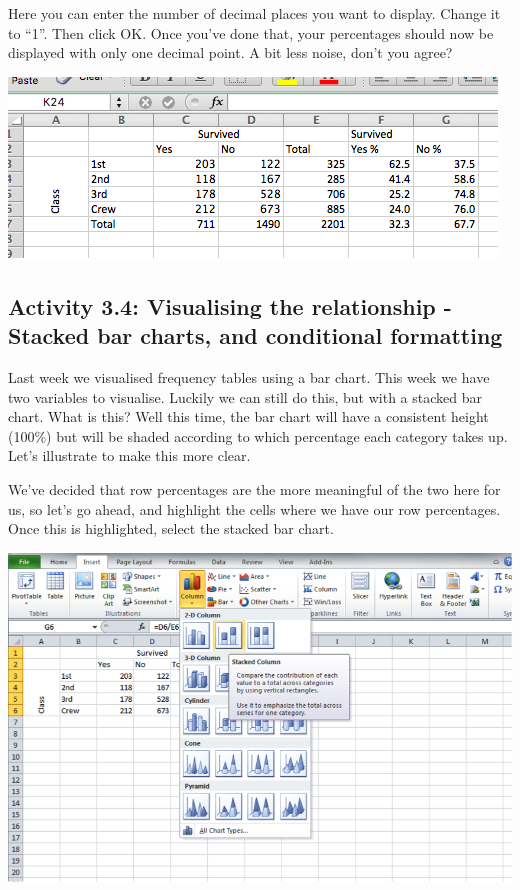 \documentclass[
]{book}
\begin{document}
Here you can enter the number of decimal places you want to display. Change it to ``1''. Then click OK. Once you've done that, your percentages should now be displayed with only one decimal point. A bit less noise, don't you agree?

\includegraphics{imgs/one_dec_row_perc.png}

\hypertarget{activity-3.4-visualising-the-relationship---stacked-bar-charts-and-conditional-formatting}{%
\subsection{Activity 3.4: Visualising the relationship - Stacked bar charts, and conditional formatting}\label{activity-3.4-visualising-the-relationship---stacked-bar-charts-and-conditional-formatting}}

Last week we visualised frequency tables using a bar chart. This week we have two variables to visualise. Luckily we can still do this, but with a stacked bar chart. What is this? Well this time, the bar chart will have a consistent height (100\%) but will be shaded according to which percentage each category takes up. Let's illustrate to make this more clear.

We've decided that row percentages are the more meaningful of the two here for us, so let's go ahead, and highlight the cells where we have our row percentages. Once this is highlighted, select the stacked bar chart.

\includegraphics{imgs/stacked_col.png}
\end{document}
